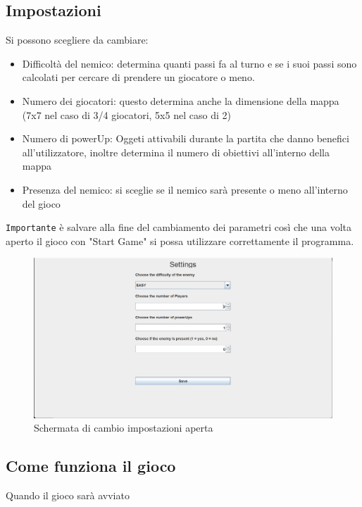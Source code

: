 \documentclass[a4paper,12pt]{report}
\begin{document}
\subsection*{Impostazioni}
Si possono scegliere da cambiare:
\begin{itemize} 
	\item Difficoltà del nemico: determina quanti passi fa al turno e se i suoi passi sono calcolati per cercare di prendere un giocatore o meno.
	\item Numero dei giocatori: questo determina anche la dimensione della mappa (7x7 nel caso di 3/4 giocatori, 5x5 nel caso di 2)
	\item Numero di powerUp: Oggeti attivabili durante la partita che danno benefici all'utilizzatore, inoltre determina il numero di obiettivi all'interno della mappa
	\item Presenza del nemico: si sceglie se il nemico sarà presente o meno all'interno del gioco
\end{itemize}
\texttt{Importante} è salvare alla fine del cambiamento dei parametri così che una volta aperto il gioco con "Start Game" si possa 
utilizzare correttamente il programma.
\begin{figure}
	\centering
	\includegraphics[width=\textwidth]{img/SettingsMenu.png}
	\caption{Schermata di cambio impostazioni aperta}
	\label{img:Settings}
\end{figure}
\subsection*{Come funziona il gioco}

Quando il gioco sarà avviato
\end{document}
